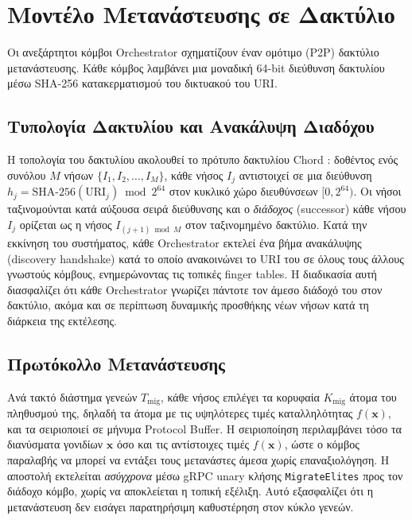 \section{Μοντέλο Μετανάστευσης σε Δακτύλιο}
\label{sec:arch_migration}

Οι ανεξάρτητοι κόμβοι Orchestrator σχηματίζουν έναν ομότιμο (P2P) δακτύλιο μετανάστευσης. Κάθε κόμβος λαμβάνει μια μοναδική 64-bit διεύθυνση δακτυλίου μέσω SHA-256 κατακερματισμού του δικτυακού του URI.

\subsection*{Τυπολογία Δακτυλίου και Ανακάλυψη Διαδόχου}

Η τοπολογία του δακτυλίου ακολουθεί το πρότυπο δακτυλίου Chord \cite{stoica2001chord}: δοθέντος ενός συνόλου $M$ νήσων $\{I_1, I_2, \ldots, I_M\}$, κάθε νήσος $I_j$ αντιστοιχεί σε μια διεύθυνση $h_j = \text{SHA-256}(\text{URI}_j) \bmod 2^{64}$ στον κυκλικό χώρο διευθύνσεων $[0, 2^{64})$. Οι νήσοι ταξινομούνται κατά αύξουσα σειρά διεύθυνσης και ο \emph{διάδοχος} (successor) κάθε νήσου $I_j$ ορίζεται ως η νήσος $I_{(j+1) \bmod M}$ στον ταξινομημένο δακτύλιο. Κατά την εκκίνηση του συστήματος, κάθε Orchestrator εκτελεί ένα βήμα ανακάλυψης (discovery handshake) κατά το οποίο ανακοινώνει το URI του σε όλους τους άλλους γνωστούς κόμβους, ενημερώνοντας τις τοπικές finger tables. Η διαδικασία αυτή διασφαλίζει ότι κάθε Orchestrator γνωρίζει πάντοτε τον άμεσο διάδοχό του στον δακτύλιο, ακόμα και σε περίπτωση δυναμικής προσθήκης νέων νήσων κατά τη διάρκεια της εκτέλεσης.

\subsection*{Πρωτόκολλο Μετανάστευσης}

Ανά τακτό διάστημα γενεών $T_{\text{mig}}$, κάθε νήσος επιλέγει τα κορυφαία $K_{\text{mig}}$ άτομα του πληθυσμού της, δηλαδή τα άτομα με τις υψηλότερες τιμές καταλληλότητας $f(\bm{x})$, και τα σειριοποιεί σε μήνυμα Protocol Buffer. Η σειριοποίηση περιλαμβάνει τόσο τα διανύσματα γονιδίων $\bm{x}$ όσο και τις αντίστοιχες τιμές $f(\bm{x})$, ώστε ο κόμβος παραλαβής να μπορεί να εντάξει τους μετανάστες άμεσα χωρίς επαναξιολόγηση. Η αποστολή εκτελείται \emph{ασύγχρονα} μέσω gRPC unary κλήσης \texttt{MigrateElites} προς τον διάδοχο κόμβο, χωρίς να αποκλείεται η τοπική εξέλιξη. Αυτό εξασφαλίζει ότι η μετανάστευση δεν εισάγει παρατηρήσιμη καθυστέρηση στον κύκλο γενεών.


